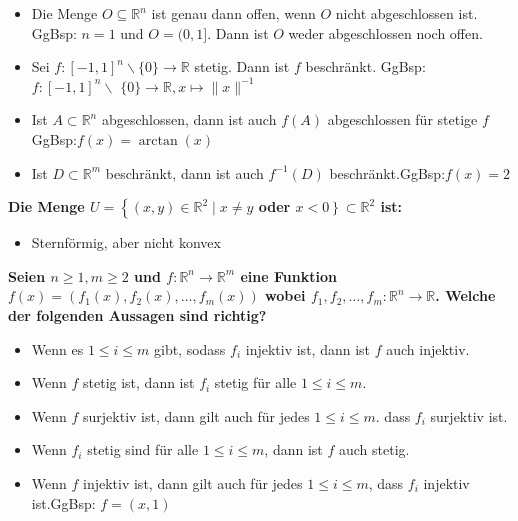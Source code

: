 \begin{flushleft}
\begin{itemize}[leftmargin = *]
\item[\textcolor{red}{F}] Die Menge $O \subseteq \mathbb{R}^n$ ist genau dann offen, wenn $O$ nicht abgeschlossen ist. \textcolor{Emerald}{GgBsp: $n=1$ und $O=(0,1]$. Dann ist $O$ weder abgeschlossen noch offen.}
\item[\textcolor{red}{F}]  Sei $f:[-1,1]^n \backslash\{0\} \rightarrow \mathbb{R}$ stetig. Dann ist $f$ beschränkt.  \textcolor{Emerald}{GgBsp: $f:[-1,1]^n \backslash$ $\{0\} \rightarrow \mathbb{R}, x \mapsto\|x\|^{-1}$}
\item[\textcolor{red}{F}] Ist $A \subset \mathbb{R}^n$ abgeschlossen, dann ist auch $f(A)$ abgeschlossen für stetige $f$\textcolor{Emerald}{GgBsp:$f(x)=\arctan(x)$}

\item[\textcolor{red}{F}] Ist $D \subset \mathbb{R}^m$ beschränkt, dann ist auch $f^{-1}(D)$ beschränkt.\textcolor{Emerald}{GgBsp:$f(x)=2$}
\end{itemize}

 \textcolor{Emerald}{}

\textbf{Die Menge $U=\left\{(x, y) \in \mathbb{R}^2 \mid x \neq y\right.$ oder $\left.x<0\right\} \subset \mathbb{R}^2$ ist: }

\begin{itemize}[leftmargin = *]
\item[\textcolor{green}{W}] Sternförmig, aber nicht konvex
\end{itemize}




\textbf{Seien $n \geq 1, m \geq 2$ und $f: \mathbb{R}^n \rightarrow \mathbb{R}^m$ eine Funktion
$f(x)=\left(f_1(x), f_2(x), \ldots, f_m(x)\right)$
wobei $f_1, f_2, \ldots, f_m: \mathbb{R}^n \rightarrow \mathbb{R}$. Welche der folgenden Aussagen sind richtig?}

\begin{itemize}[leftmargin = *]
\item[\textcolor{green}{W}] Wenn es $1 \leq i \leq m$ gibt, sodass $f_i$ injektiv ist, dann ist $f$ auch injektiv.
\item[\textcolor{green}{W}] Wenn $f$ stetig ist, dann ist $f_i$ stetig für alle $1 \leq i \leq m$.	
\item[\textcolor{green}{W}] Wenn $f$ surjektiv ist, dann gilt auch für jedes $1 \leq i \leq m$. dass $f_i$ surjektiv ist.
\item[\textcolor{green}{W}] Wenn $f_i$ stetig sind für alle $1 \leq i \leq m$, dann ist $f$ auch stetig.
\item[\textcolor{red}{F}]  Wenn $f$ injektiv ist, dann gilt auch für jedes $1 \leq i \leq m$, dass $f_i$ injektiv ist.\textcolor{Emerald}{GgBsp: $f=(x,1)$}


\end{itemize}
\end{flushleft}
